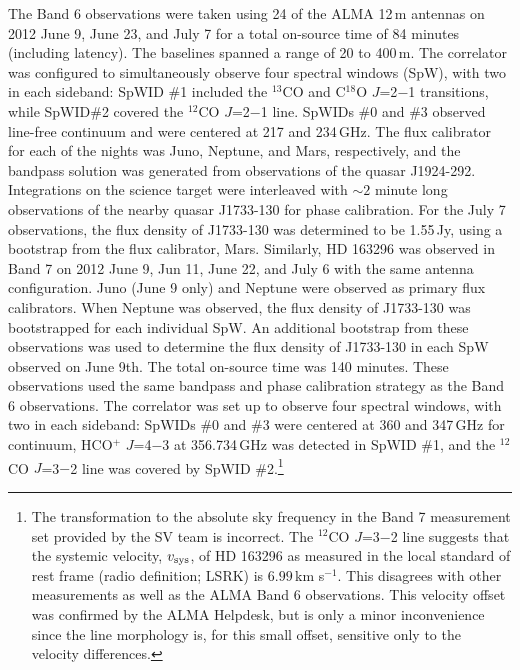The Band 6 observations were taken using 24 of the ALMA 12\,m antennas on 2012 
June 9, June 23, and July 7 for a total on-source time of 84 minutes (including 
latency).  The baselines spanned a range of 20 to 400\,m.  The correlator was 
configured to simultaneously observe four spectral windows (SpW), with two in 
each sideband:  SpWID \#1 included the $^{13}$CO and C$^{18}$O $J$=2$-$1
transitions, while SpWID\#2 covered the  $^{12}$CO $J$=2$-$1 line.  SpWIDs \#0 
and \#3 observed line-free continuum \citep[but see][]{qi13} and were centered 
at 217 and 234\,GHz.  The flux calibrator for each of the nights was Juno, 
Neptune, and Mars, respectively, and the bandpass solution was generated from 
observations of the quasar J1924-292.  Integrations on the science target were 
interleaved with $\sim 2$ minute long observations of the nearby quasar 
J1733-130 for phase calibration.  For the July 7 observations, the flux density 
of J1733-130 was determined to be 1.55\,Jy, using a bootstrap from the flux 
calibrator, Mars.  Similarly, HD 163296 was observed in Band 7 on 2012 June 9, 
Jun 11, June 22, and July 6 with the same antenna configuration.  Juno (June 9 
only) and Neptune were observed as primary flux calibrators.  When Neptune was 
observed, the flux density of J1733-130 was bootstrapped for each individual 
SpW.  An additional bootstrap from these observations was used to determine the 
flux density of J1733-130 in each SpW observed on June 9th.  The total 
on-source time was 140 minutes.  These observations used the same bandpass and 
phase calibration strategy as the Band 6 observations.  The correlator was set 
up to observe four spectral windows, with two in each sideband: SpWIDs \#0 and 
\#3 were centered at 360 and 347\,GHz for continuum, HCO$^+$ $J$=4$-$3 at 
356.734\,GHz was detected in SpWID \#1, and the $^{12}$CO $J$=3$-$2 line was 
covered by SpWID \#2.\footnote{The transformation to the absolute sky frequency 
in the Band 7 measurement set provided by the SV team is incorrect.  The 
$^{12}$CO $J$=3$-$2 line suggests that the systemic velocity, $v_{\rm sys}$, of 
HD 163296 as measured in the local standard of rest frame (radio definition; 
LSRK) is $6.99$\,km s$^{-1}$.  This disagrees with other measurements 
\citep[$v_{\rm sys}=5.8$\,km s$^{-1}$;][]{mannings97,isella07,hughes08} as well 
as the ALMA Band 6 observations.  This velocity offset was confirmed by the ALMA
Helpdesk, but is only a minor inconvenience since the line morphology is, for 
this small offset, sensitive only to the velocity differences.}

